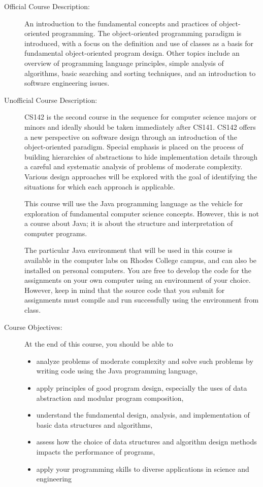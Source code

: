 \documentclass [letterpaper,11pt]{article}
\begin{document}
\begin{description}

\item[Official Course Description:]
An introduction to the fundamental concepts and practices of object-oriented programming. The object-oriented programming paradigm is introduced, with a focus on the definition and use of classes as a basis for fundamental object-oriented program design. Other topics include an overview of programming language principles, simple analysis of algorithms, basic searching and sorting techniques, and an introduction to software engineering issues.

\item[Unofficial Course Description:]
CS142 is the second course in the sequence for computer science majors or minors and ideally should be taken immediately after CS141. CS142 offers a new perspective on software design through an introduction of the object-oriented paradigm. Special emphasis is placed on the process of building hierarchies of abstractions to hide implementation details through a careful and systematic analysis of problems of moderate complexity. Various design approaches will be explored with the goal of identifying the situations for which each approach is applicable. 

This course will use the Java programming language as the vehicle for exploration of fundamental computer science concepts. However, this is not a course about Java; it is about the structure and interpretation of computer programs.

The particular Java environment that will be used in this course is available in the computer labs on Rhodes College campus, 
and can also be installed on personal computers.
You are free to develop the code for the assignments on your own computer using an environment of your choice. However, keep in mind that the source code that you submit for assignments must compile and run successfully using the environment from class.

\item[Course Objectives:]
At the end of this course, you should be able to
\begin{itemize} \setlength{\itemsep}{0em}\setlength{\parskip}{0pt}
	\item analyze problems of moderate complexity and solve such problems by writing code using the Java programming language,
	\item apply principles of good program design, especially the uses of data abstraction and modular program composition,
	\item understand the fundamental design, analysis, and implementation of basic data structures and algorithms,
	\item assess how the choice of data structures and algorithm design methods impacts the performance of programs,
	\item apply your programming skills to diverse applications in science and engineering
\end{itemize}




\end{description}
\end{document}
